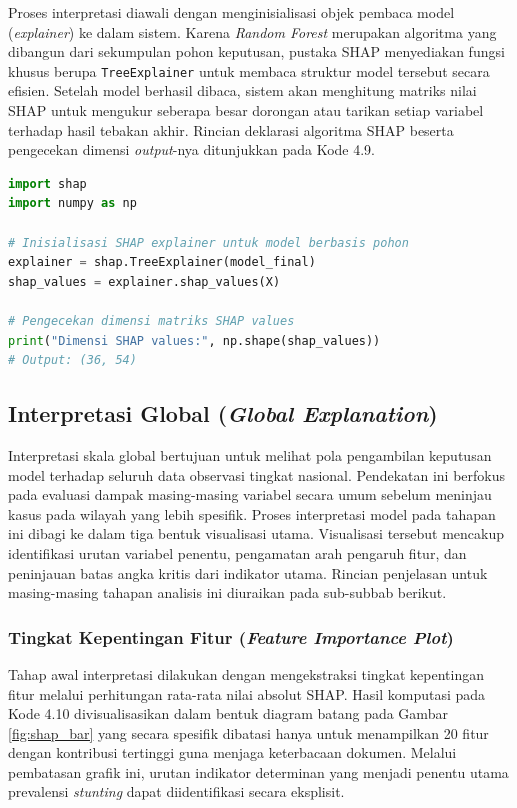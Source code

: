 Proses interpretasi diawali dengan menginisialisasi objek pembaca model (\textit{explainer}) ke dalam sistem. Karena \textit{Random Forest} merupakan algoritma yang dibangun dari sekumpulan pohon keputusan, pustaka SHAP menyediakan fungsi khusus berupa \texttt{TreeExplainer} untuk membaca struktur model tersebut secara efisien. Setelah model berhasil dibaca, sistem akan menghitung matriks nilai SHAP untuk mengukur seberapa besar dorongan atau tarikan setiap variabel terhadap hasil tebakan akhir. Rincian deklarasi algoritma SHAP beserta pengecekan dimensi \textit{output}-nya ditunjukkan pada Kode 4.9.

\begin{lstlisting}[language=Python, caption={Inisialisasi TreeExplainer dan Ekstraksi Nilai SHAP}, label={code:shap_init}, frame=single, basicstyle=\ttfamily\scriptsize, breaklines=true]
import shap
import numpy as np

# Inisialisasi SHAP explainer untuk model berbasis pohon
explainer = shap.TreeExplainer(model_final)
shap_values = explainer.shap_values(X)

# Pengecekan dimensi matriks SHAP values
print("Dimensi SHAP values:", np.shape(shap_values))
# Output: (36, 54)
\end{lstlisting}

\subsection{Interpretasi Global (\textit{Global Explanation})}
Interpretasi skala global bertujuan untuk melihat pola pengambilan keputusan model terhadap seluruh data observasi tingkat nasional. Pendekatan ini berfokus pada evaluasi dampak masing-masing variabel secara umum sebelum meninjau kasus pada wilayah yang lebih spesifik. Proses interpretasi model pada tahapan ini dibagi ke dalam tiga bentuk visualisasi utama. Visualisasi tersebut mencakup identifikasi urutan variabel penentu, pengamatan arah pengaruh fitur, dan peninjauan batas angka kritis dari indikator utama. Rincian penjelasan untuk masing-masing tahapan analisis ini diuraikan pada sub-subbab berikut.

\subsubsection{Tingkat Kepentingan Fitur (\textit{Feature Importance Plot})}
Tahap awal interpretasi dilakukan dengan mengekstraksi tingkat kepentingan fitur melalui perhitungan rata-rata nilai absolut SHAP. Hasil komputasi pada Kode 4.10 divisualisasikan dalam bentuk diagram batang pada Gambar \ref{fig:shap_bar} yang secara spesifik dibatasi hanya untuk menampilkan 20 fitur dengan kontribusi tertinggi guna menjaga keterbacaan dokumen. Melalui pembatasan grafik ini, urutan indikator determinan yang menjadi penentu utama prevalensi \textit{stunting} dapat diidentifikasi secara eksplisit.

